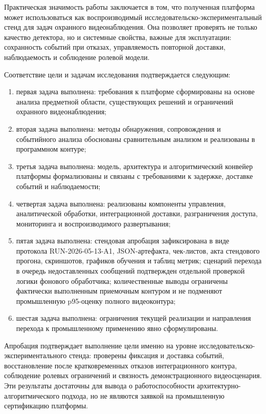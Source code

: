 Практическая значимость работы заключается в том, что полученная платформа может использоваться как воспроизводимый исследовательско-экспериментальный стенд для задач охранного видеонаблюдения. Она позволяет проверять не только качество детектора, но и системные свойства, важные для эксплуатации: сохранность событий при отказах, управляемость повторной доставки, наблюдаемость и соблюдение ролевой модели.

Соответствие цели и задачам исследования подтверждается следующим:
\begin{enumerate}
    \item первая задача выполнена: требования к платформе сформированы на основе анализа предметной области, существующих решений и ограничений охранного видеонаблюдения;
    \item вторая задача выполнена: методы обнаружения, сопровождения и событийного анализа обоснованы сравнительным анализом и реализованы в программном контуре;
    \item третья задача выполнена: модель, архитектура и алгоритмический конвейер платформы формализованы и связаны с требованиями к задержке, доставке событий и наблюдаемости;
    \item четвертая задача выполнена: реализованы компоненты управления, аналитической обработки, интеграционной доставки, разграничения доступа, мониторинга и воспроизводимого развертывания;
    \item пятая задача выполнена: стендовая апробация зафиксирована в виде протокола RUN-2026-05-13-A1, JSON-артефакта, чек-листов, акта стендового прогона, скриншотов, графиков обучения и таблиц метрик; сценарий перехода в очередь недоставленных сообщений подтвержден отдельной проверкой логики фонового обработчика; количественные выводы ограничены фактически выполненным приемочным контуром и не подменяют промышленную p95-оценку полного видеоконтура;
    \item шестая задача выполнена: ограничения текущей реализации и направления перехода к промышленному применению явно сформулированы.
\end{enumerate}

Апробация подтверждает выполнение цели именно на уровне исследовательско-экспериментального стенда: проверены фиксация и доставка событий, восстановление после кратковременных отказов интеграционного контура, соблюдение ролевых ограничений и связность демонстрационного видеосценария. Эти результаты достаточны для вывода о работоспособности архитектурно-алгоритмического подхода, но не являются заявкой на промышленную сертификацию платформы.

